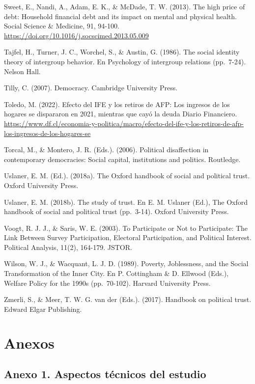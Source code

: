 \documentclass[
  12pt,
]{book}
\begin{document}
Sweet, E., Nandi, A., Adam, E. K., \& McDade, T. W. (2013). The high price of debt: Household financial debt and its impact on mental and physical health. Social Science \& Medicine, 91, 94-100. \url{https://doi.org/10.1016/j.socscimed.2013.05.009}

Tajfel, H., Turner, J. C., Worchel, S., \& Austin, G. (1986). The social identity theory of intergroup behavior. En Psychology of intergroup relations (pp.~7-24). Nelson Hall.

Tilly, C. (2007). Democracy. Cambridge University Press.

Toledo, M. (2022). Efecto del IFE y los retiros de AFP: Los ingresos de los hogares se dispararon en 2021, mientras que cayó la deuda \textbar{} Diario Financiero. \url{https://www.df.cl/economia-y-politica/macro/efecto-del-ife-y-los-retiros-de-afp-los-ingresos-de-los-hogares-se}

Torcal, M., \& Montero, J. R. (Eds.). (2006). Political disaffection in contemporary democracies: Social capital, institutions and politics. Routledge.

Uslaner, E. M. (Ed.). (2018a). The Oxford handbook of social and political trust. Oxford University Press.

Uslaner, E. M. (2018b). The study of trust. En E. M. Uslaner (Ed.), The Oxford handbook of social and political trust (pp.~3-14). Oxford University Press.

Voogt, R. J. J., \& Saris, W. E. (2003). To Participate or Not to Participate: The Link Between Survey Participation, Electoral Participation, and Political Interest. Political Analysis, 11(2), 164-179. JSTOR.

Wilson, W. J., \& Wacquant, L. J. D. (1989). Poverty, Joblessness, and the Social Transformation of the Inner City. En P. Cottingham \& D. Ellwood (Eds.), Welfare Policy for the 1990s (pp.~70-102). Harvard University Press.

Zmerli, S., \& Meer, T. W. G. van der (Eds.). (2017). Handbook on political trust. Edward Elgar Publishing.

\hypertarget{anexos}{%
\chapter*{Anexos}\label{anexos}}

\hypertarget{anexo-1.-aspectos-tuxe9cnicos-del-estudio}{%
\section*{Anexo 1. Aspectos técnicos del estudio}\label{anexo-1.-aspectos-tuxe9cnicos-del-estudio}}
\end{document}
